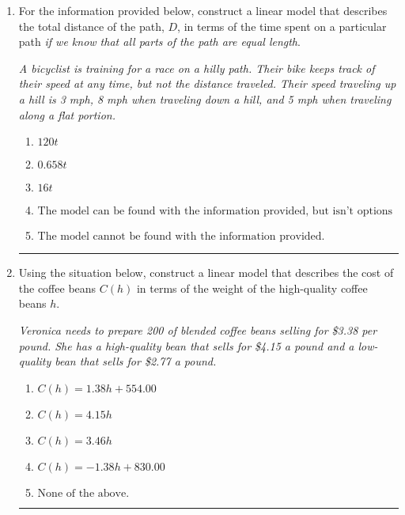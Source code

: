 \documentclass[14pt]{extbook}
\newcommand{\litem}[1]{\item#1\hspace*{-1cm}\rule{\textwidth}{0.4pt}}
\begin{document}
\begin{enumerate}
{\begin{enumerate}[label=\Alph*.]
\end{enumerate} }
\litem{
For the information provided below, construct a linear model that describes the total distance of the path, $D$, in terms of the time spent on a particular path \textit{if we know that all parts of the path are equal length}.
\begin{center}
    \textit{ A bicyclist is training for a race on a hilly path. Their bike keeps track of their speed at any time, but not the distance traveled. Their speed traveling up a hill is 3 mph, 8 mph when traveling down a hill, and 5 mph when traveling along a flat portion. }
\end{center}
\begin{enumerate}[label=\Alph*.]
\item \( 120 t \)
\item \( 0.658 t \)
\item \( 16 t \)
\item \( \text{The model can be found with the information provided, but isn't options 1-3.} \)
\item \( \text{The model cannot be found with the information provided.} \)

\end{enumerate} }
\litem{
Using the situation below, construct a linear model that describes the cost of the coffee beans $C(h)$ in terms of the weight of the high-quality coffee beans $h$.
\begin{center}
    \textit{ Veronica needs to prepare 200 of blended coffee beans selling for \$3.38 per pound. She has a high-quality bean that sells for \$4.15 a pound and a low-quality bean that sells for \$2.77 a pound. }
\end{center}
\begin{enumerate}[label=\Alph*.]
\item \( C(h) = 1.38 h + 554.00 \)
\item \( C(h) = 4.15 h \)
\item \( C(h) = 3.46 h \)
\item \( C(h) = -1.38 h + 830.00 \)
\item \( \text{None of the above.} \)


\end{enumerate}}
\end{enumerate}
\end{document}
